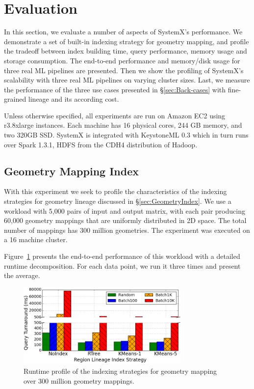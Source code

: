 \documentclass{sig-alternate}
\begin{document}
\section{Evaluation}
\label{sec:Perf}
In this section, we evaluate a number of aspects of SystemX's performance.
We demonstrate a set of built-in indexing strategy for geometry mapping, and profile the tradeoff
between index building time, query performance, memory usage and storage consumption.
The end-to-end performance and memory/disk usage for three real ML pipelines are presented.
Then we show the profiling of SystemX's scalability with three real ML pipelines on varying cluster sizes.
Last, we measure the performance of the three use cases presented in \S\ref{sec:Back-cases} with 
fine-grained lineage and its according cost.

Unless otherwise specified, all experiments are run on Amazon EC2 using r3.8xlarge instances.
Each machine has 16 physical cores, 244 GB memory, and two 320GB SSD. 
SystemX is integrated with KeystoneML 0.3 which in turn runs over Spark 1.3.1, HDFS from the
CDH4 distribution of Hadoop. 

\subsection{Geometry Mapping Index}
\label{sec:Perf-Index}
With this experiment we seek to profile the characteristics of the indexing strategies for geometry lineage discussed in \S\ref{sec:GeometryIndex}.
We use a workload with 5,000 pairs of input and output matrix, with each pair producing 60,000 geometry mappings that are uniformly distributed
in 2D space. The total number of mappings has 300 million geometries. The experiment was executed on a 16 machine cluster.

Figure~\ref{fig:sift-time} presents the end-to-end performance of this workload with a detailed runtime decomposition. For each data point, 
we run it three times and present the average. 

\begin{figure}[t]
\begin{center}
    \includegraphics[width=85mm]{pictures/SIFTIndex-Time}
\caption {Runtime profile of the indexing strategies for geometry mapping over 300 million geometry mappings.
    \label{fig:sift-time}
}
\end{center}
\end{figure}
\end{document}
